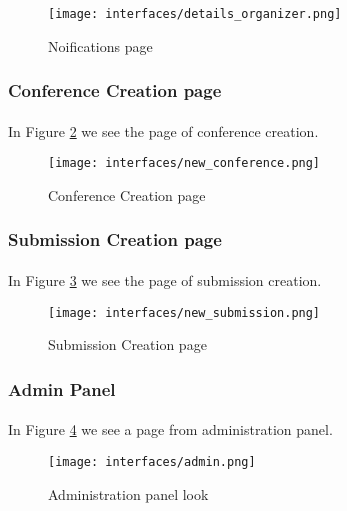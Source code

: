 		\begin{figure}[!ht]
			\centering
			\texttt{[image: interfaces/details\_organizer.png]}
			\caption{Noifications page}
			\label{fig:notifications}
		\end{figure}

	\subsubsection{Conference Creation page}
		\paragraph{}
		In Figure \ref{fig:new-conf} we see the page of conference creation.
		
		\begin{figure}[!ht]
			\centering
			\texttt{[image: interfaces/new\_conference.png]}
			\caption{Conference Creation page}
			\label{fig:new-conf}
		\end{figure}
	
	\subsubsection{Submission Creation page}
		\paragraph{}
		In Figure \ref{fig:new-sub} we see the page of submission creation.
		
		\begin{figure}[!ht]
			\centering
			\texttt{[image: interfaces/new\_submission.png]}
			\caption{Submission Creation page}
			\label{fig:new-sub}
		\end{figure}
		
	\subsubsection{Admin Panel}
		\paragraph{}
		In Figure \ref{fig:admin} we see a page from administration panel.
		
		\begin{figure}[!ht]
			\centering
			\texttt{[image: interfaces/admin.png]}
			\caption{Administration panel look}
			\label{fig:admin}
		\end{figure}